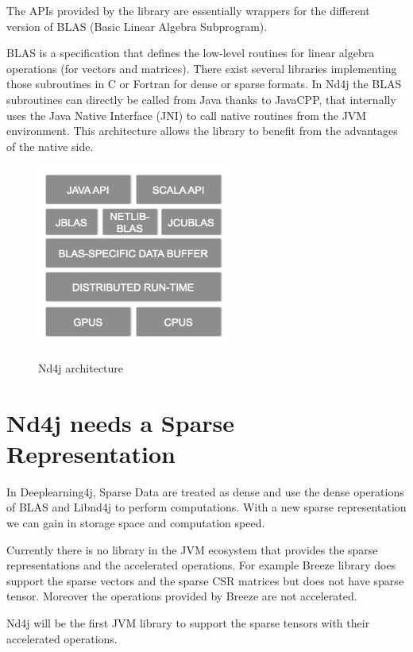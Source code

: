 The APIs provided by the library are essentially wrappers for the different version of BLAS (Basic Linear Algebra Subprogram). 

BLAS is  a specification that defines the low-level routines for linear algebra operations (for vectors and matrices). There exist several libraries implementing those subroutines in C or Fortran for dense or sparse formats. In Nd4j the BLAS subroutines can directly be called from Java thanks to JavaCPP, that internally uses the Java Native Interface (JNI) to call native routines from the JVM environment. This architecture allows the library to benefit from the advantages of the native side.

\begin{figure}[h]
	\begin{center}
		\includegraphics[width=2.5in]{images/nd4j_architecture.png} 
		\label{fig:hierachy}
		\caption{Nd4j architecture}
	\end{center}
\end{figure}

\section{Nd4j needs a Sparse Representation}

In Deeplearning4j, Sparse Data are treated as dense and use the dense operations of BLAS and Libnd4j to perform computations. With a new sparse representation we can gain in storage space and computation speed.

Currently there is no library in the JVM ecosystem that provides the sparse representations and the accelerated operations. For example Breeze library \cite{breeze} does support the sparse vectors and the sparse CSR matrices but does not have sparse tensor. Moreover the operations provided by Breeze are not accelerated. 

Nd4j will be the first JVM library to support the sparse tensors with their accelerated operations.
